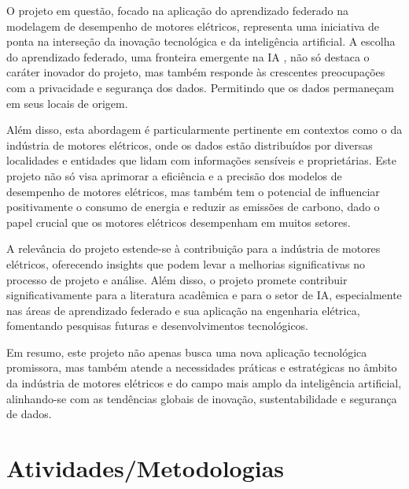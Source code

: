 \documentclass{article}
\begin{document}
O projeto em questão, focado na aplicação do aprendizado federado na modelagem de desempenho de motores elétricos, representa uma iniciativa de ponta na interseção da inovação tecnológica e da inteligência artificial. A escolha do aprendizado federado, uma fronteira emergente na IA \cite{peter2021advances,ye2023heterogeneous}, não só destaca o caráter inovador do projeto, mas também responde às crescentes preocupações com a privacidade e segurança dos dados. Permitindo que os dados permaneçam em seus locais de origem.

Além disso, esta abordagem é particularmente pertinente em contextos como o da indústria de motores elétricos, onde os dados estão distribuídos por diversas localidades e entidades que lidam com informações sensíveis e proprietárias. Este projeto não só visa aprimorar a eficiência e a precisão dos modelos de desempenho de motores elétricos, mas também tem o potencial de influenciar positivamente o consumo de energia e reduzir as emissões de carbono, dado o papel crucial que os motores elétricos desempenham em muitos setores.

A relevância do projeto estende-se à contribuição para a indústria de motores elétricos, oferecendo insights que podem levar a melhorias significativas no processo de projeto e análise. Além disso, o projeto promete contribuir significativamente para a literatura acadêmica e para o setor de IA, especialmente nas áreas de aprendizado federado e sua aplicação na engenharia elétrica, fomentando pesquisas futuras e desenvolvimentos tecnológicos.

Em resumo, este projeto não apenas busca uma  nova aplicação tecnológica promissora, mas também atende a necessidades práticas e estratégicas no âmbito da indústria de motores elétricos e do campo mais amplo da inteligência artificial, alinhando-se com as tendências globais de inovação, sustentabilidade e segurança de dados.

\section{Atividades/Metodologias}
\end{document}
